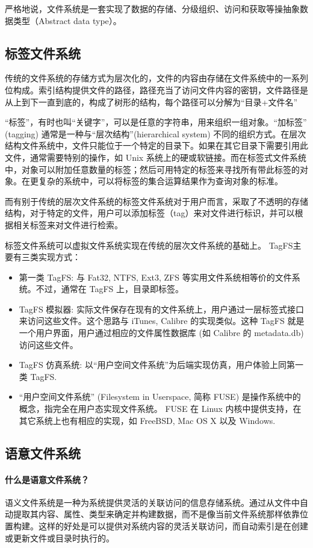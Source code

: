 \documentclass[UTF8]{ctexart}
\begin{document}
严格地说，文件系统是一套实现了数据的存储、分级组织、访问和获取等操抽象数据类型（Abstract data type）。

\subsection{标签文件系统}
传统的文件系统的存储方式为层次化的，文件的内容由存储在文件系统中的一系列位构成。索引结构提供文件的路径，路径充当了访问文件内容的密钥，文件路径是从上到下一直到底的，构成了树形的结构，每个路径可以分解为“目录+文件名”

“标签”，有时也叫“关键字”，可以是任意的字符串，用来组织一组对象。“加标签” (tagging) 通常是一种与“层次结构”(hierarchical system) 不同的组织方式。在层次结构文件系统中，文件只能位于一个特定的目录下。如果在其它目录下需要引用此文件，通常需要特别的操作，如 Unix 系统上的硬或软链接。而在标签式文件系统中，对象可以附加任意数量的标签；然后可用特定的标签来寻找所有带此标签的对象。在更复杂的系统中，可以将标签的集合运算结果作为查询对象的标准。

而有别于传统的层次文件系统的标签文件系统对于用户而言，采取了不透明的存储结构，对于特定的文件，用户可以添加标签（tag）来对文件进行标识，并可以根据相关标签来对文件进行检索。

标签文件系统可以虚拟文件系统实现在传统的层次文件系统的基础上。
TagFS主要有三类实现方式：
\begin{itemize}
  \item 第一类 TagFS: 与 Fat32, NTFS, Ext3, ZFS 等实用文件系统相等价的文件系统。不过，通常在 TagFS 上，目录即标签。
  \item TagFS 模拟器: 实际文件保存在现有的文件系统上，用户通过一层标签式接口来访问这些文件。这个思路与 iTunes, Calibre 的实现类似。这种 TagFS 就是一个用户界面，用户通过相应的文件属性数据库 (如 Calibre 的 metadata.db) 访问这些文件。
  \item TagFS 仿真系统: 以“用户空间文件系统”为后端实现仿真，用户体验上同第一类 TagFS. 
  \item “用户空间文件系统” (Filesystem in Userspace, 简称 FUSE) 是操作系统中的概念，指完全在用户态实现文件系统。 FUSE 在 Linux 内核中提供支持，在其它系统上也有相应的实现，如 FreeBSD, Mac OS X 以及 Windows.
\end{itemize}

\subsection{语意文件系统}
\paragraph{什么是语意文件系统？}
语义文件系统是一种为系统提供灵活的关联访问的信息存储系统。通过从文件中自动提取其内容、属性、类型来确定并构建数据，而不是像当前文件系统那样依靠位置构建。这样的好处是可以提供对系统内容的灵活关联访问，而自动索引是在创建或更新文件或目录时执行的。
\end{document}
